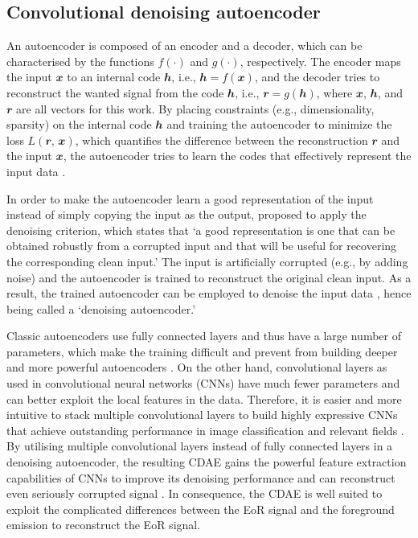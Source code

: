 \documentclass[fleqn,usenatbib]{mnras}
\newcommand{\B}[1]{\mathbfit{#1}}
\newcommand{\editwip}[1]{{\leavevmode\color{magenta}#1}}
\begin{document}
\subsection{Convolutional denoising autoencoder}
\label{sec:cdae}

An autoencoder is composed of an encoder and a decoder, which can be
characterised by the functions $f(\cdot)$ and $g(\cdot)$, respectively.
The encoder maps the input $\B{x}$ to an internal code $\B{h}$, i.e.,
$\B{h} = f(\B{x})$, and the decoder tries to reconstruct the wanted
signal from the code $\B{h}$, i.e., $\B{r} = g(\B{h})$, where $\B{x}$,
$\B{h}$, and $\B{r}$ are all vectors for this work.
By placing constraints (e.g., dimensionality, sparsity) on the
internal code $\B{h}$ and training the autoencoder to minimize the
loss $L(\B{r}, \, \B{x})$, which quantifies the difference between the
reconstruction $\B{r}$ and the input $\B{x}$, the autoencoder tries to
learn the codes that effectively represent the input data
\citep[e.g.,][chapter 14]{goodfellow2016}.

\editwip{%
In order to make the autoencoder learn a good representation of the input
instead of simply copying the input as the output,
\citet{vincent2008,vincent2010} proposed to apply the denoising criterion,
which states that `a good representation is one that can be obtained
robustly from a corrupted input and that will be useful for recovering the
corresponding clean input.'
The input is artificially corrupted (e.g., by adding noise) and the
autoencoder is trained to reconstruct the original clean input.
As a result, the trained autoencoder can be employed to denoise the input
data \citep[e.g.,][]{xie2012,gondara2016}, hence being called a
`denoising autoencoder.'

Classic autoencoders use fully connected layers and thus have a large
number of parameters, which make the training difficult and prevent from
building deeper and more powerful autoencoders
\citep[e.g.,][]{glorot2010,larochelle2009}.
On the other hand, convolutional layers as used in convolutional neural
networks (CNNs) have much fewer parameters and can better exploit the local
features in the data.  Therefore, it is easier and more intuitive to stack
multiple convolutional layers to build highly expressive CNNs that achieve
outstanding performance in image classification and relevant fields
\citep[e.g.,][]{krizhevsky2012,simonyan2014,szegedy2015}.
By utilising multiple convolutional layers instead of fully connected
layers in a denoising autoencoder, the resulting CDAE gains the powerful
feature extraction capabilities of CNNs to improve its denoising
performance and can reconstruct even seriously corrupted signal
\citep[e.g.,][]{du2017}.
In consequence, the CDAE is well suited to exploit the complicated
differences between the EoR signal and the foreground emission to
reconstruct the EoR signal.
}  %
\end{document}
